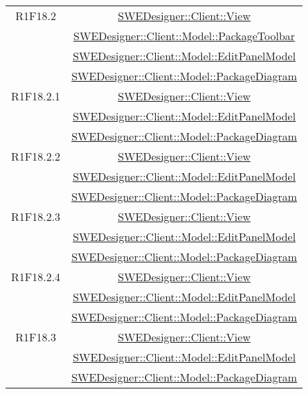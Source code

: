 \documentclass[../SpecificaTecnica.tex]{subfiles}
\begin{document}
\begin{longtable}{|c|c|}
		R1F18.2 & \hyperlink{SWEDesigner::Client::View}{SWEDesigner::Client::View} \\& \hyperlink{SWEDesigner::Client::Model::PackageToolbar}{SWEDesigner::Client::Model::PackageToolbar} \\& \hyperlink{SWEDesigner::Client::Model::EditPanelModel}{SWEDesigner::Client::Model::EditPanelModel} \\& \hyperlink{SWEDesigner::Client::Model::PackageDiagram}{SWEDesigner::Client::Model::PackageDiagram} \\\hline
		R1F18.2.1 & \hyperlink{SWEDesigner::Client::View}{SWEDesigner::Client::View} \\& \hyperlink{SWEDesigner::Client::Model::EditPanelModel}{SWEDesigner::Client::Model::EditPanelModel} \\& \hyperlink{SWEDesigner::Client::Model::PackageDiagram}{SWEDesigner::Client::Model::PackageDiagram} \\\hline
		R1F18.2.2 & \hyperlink{SWEDesigner::Client::View}{SWEDesigner::Client::View} \\& \hyperlink{SWEDesigner::Client::Model::EditPanelModel}{SWEDesigner::Client::Model::EditPanelModel} \\& \hyperlink{SWEDesigner::Client::Model::PackageDiagram}{SWEDesigner::Client::Model::PackageDiagram} \\\hline
		R1F18.2.3 & \hyperlink{SWEDesigner::Client::View}{SWEDesigner::Client::View} \\& \hyperlink{SWEDesigner::Client::Model::EditPanelModel}{SWEDesigner::Client::Model::EditPanelModel} \\& \hyperlink{SWEDesigner::Client::Model::PackageDiagram}{SWEDesigner::Client::Model::PackageDiagram} \\\hline
		R1F18.2.4 & \hyperlink{SWEDesigner::Client::View}{SWEDesigner::Client::View} \\& \hyperlink{SWEDesigner::Client::Model::EditPanelModel}{SWEDesigner::Client::Model::EditPanelModel} \\& \hyperlink{SWEDesigner::Client::Model::PackageDiagram}{SWEDesigner::Client::Model::PackageDiagram} \\\hline
		R1F18.3 & \hyperlink{SWEDesigner::Client::View}{SWEDesigner::Client::View} \\& \hyperlink{SWEDesigner::Client::Model::EditPanelModel}{SWEDesigner::Client::Model::EditPanelModel} \\& \hyperlink{SWEDesigner::Client::Model::PackageDiagram}{SWEDesigner::Client::Model::PackageDiagram} \\\hline

\end{longtable}
\end{document}
